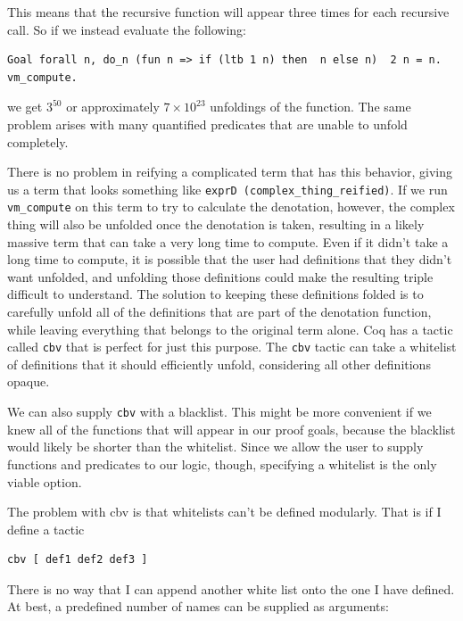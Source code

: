 \documentclass{puthesis}
\begin{document}
This means that
the recursive function will appear three times for each recursive
call. So if we instead evaluate the following:

\begin{lstlisting}
Goal forall n, do_n (fun n => if (ltb 1 n) then  n else n)  2 n = n.
vm_compute.
\end{lstlisting}

\noindent we get  $3^{50}$ or approximately $7\times 10^{23}$ unfoldings
of the function. The same problem arises with many quantified
predicates that are unable to unfold completely. 

There is no problem in reifying a complicated term that has this behavior, giving
us a term that looks something like 
\lstinline|exprD (complex_thing_reified)|. 
If we run \lstinline|vm_compute| on this
term to try to calculate the denotation, however, the complex thing will also be
unfolded once the denotation is taken, resulting in a likely massive term
that can take a very long time to compute. Even if it didn't take a
long time to compute, it is possible that the user had definitions
that they didn't want unfolded, and unfolding those definitions could
make the resulting triple difficult to understand.
The solution to keeping these definitions folded is to
carefully unfold all of the definitions that are part of the
denotation function, while leaving everything that belongs to the
original term alone. Coq has a tactic called \lstinline|cbv| that is
perfect for just this purpose. The \lstinline|cbv| tactic can take a
whitelist of definitions that it should efficiently unfold,
considering all other definitions opaque.

We can also supply \lstinline|cbv| with a blacklist. This might be
more convenient if we knew all of the functions that will appear in
our proof goals, because the blacklist would likely be shorter than
the whitelist. Since we allow the user to supply functions and
predicates to our logic, though, specifying a whitelist is the only
viable option.

The problem with cbv is that whitelists can't be defined
modularly. That is if I define a tactic 

\begin{lstlisting}
cbv [ def1 def2 def3 ]
\end{lstlisting}

There is no way that I can append another white list onto the one I have
defined. At best, a predefined number of names can be supplied as
arguments:
\end{document}
